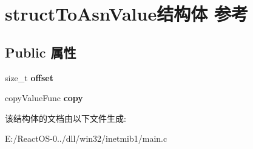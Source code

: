 \hypertarget{structstruct_to_asn_value}{}\section{struct\+To\+Asn\+Value结构体 参考}
\label{structstruct_to_asn_value}
\subsection*{Public 属性}
\begin{DoxyCompactItemize}
\item 
\mbox{\label{structstruct_to_asn_value_a681e1c34964dd134c0936c1d22437aab}} 
size\+\_\+t {\bfseries offset}
\item 
\mbox{\label{structstruct_to_asn_value_a0ba8af2612fd347f74cc177aee97cc77}} 
copy\+Value\+Func {\bfseries copy}
\end{DoxyCompactItemize}


该结构体的文档由以下文件生成\+:\begin{DoxyCompactItemize}
\item 
E\+:/\+React\+O\+S-\/0../dll/win32/inetmib1/main.\+c\end{DoxyCompactItemize}
